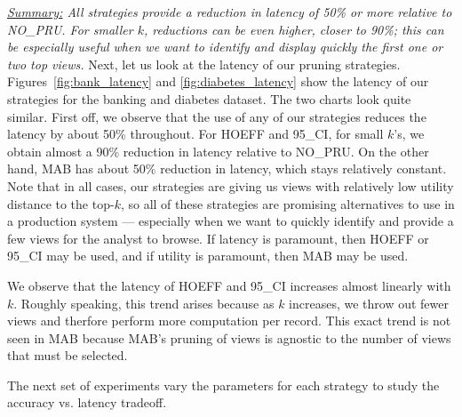 
{\em \underline{Summary:} All strategies provide a reduction in latency of 50\% or more
relative to NO\_PRU. For smaller $k$, reductions can be even higher, closer to 90\%; this can be
especially useful when we want to identify and display quickly the first one or two top views.}
Next, let us look at the latency of our pruning strategies.
Figures~\ref{fig:bank_latency} and \ref{fig:diabetes_latency} show the latency
of our strategies for the banking and diabetes dataset.
The two charts look quite similar.
First off, we observe that the use of any of our strategies reduces the
latency by about 50\% throughout.
For HOEFF and 95\_CI, for small $k$'s, we obtain almost a 90\% reduction in
latency relative to NO\_PRU. 
On the other hand, MAB has about 50\% reduction in latency, which stays relatively
constant. 
Note that in all cases, our strategies are giving us views
with relatively low utility distance to the top-$k$,
so all of these strategies are promising alternatives to use 
in a production system --- especially when we want to quickly identify and provide a few 
views for the analyst to browse.
If latency is paramount, then HOEFF or 95\_CI may be used,
and if utility is paramount, then MAB may be used.


We observe that the latency of HOEFF and 95\_CI increases almost linearly
with $k$.
Roughly speaking, this trend arises because as $k$
increases, we throw out fewer views and therfore perform more
computation per record.
This exact trend is not seen in MAB because MAB's pruning of views is agnostic
to the number of views that must be selected.

The next set of experiments vary the parameters for each strategy to study
the accuracy vs. latency tradeoff.


